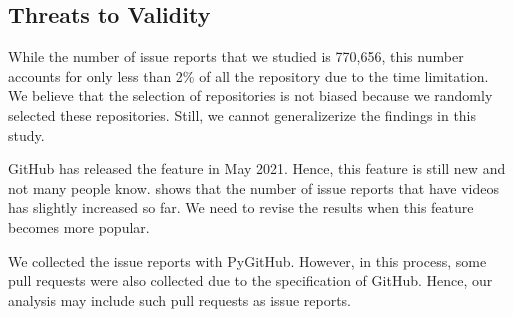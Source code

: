 \subsection{Threats to Validity}
\label{sec:limitation}

While the number of issue reports that we studied is 770,656,  this number accounts for only less than 2\% of all the repository due to the time limitation. 
We believe that the selection of repositories is not biased because we randomly selected these repositories. 
Still, we cannot generalizerize the findings in this study. 

GitHub has released the feature in May 2021. 
Hence, this feature is still new and not many people know.  shows that the number of issue reports that have videos has slightly increased so far.
We need to revise the results when this feature becomes more popular. 

We collected the issue reports with PyGitHub. 
However, in this process, some pull requests were also collected due to the specification of GitHub. 
Hence, our analysis may include such pull requests as issue reports. 